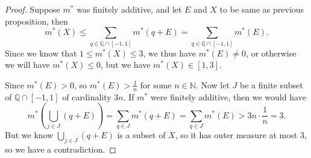 \begin{proof}
    Suppose \(m^*\) was finitely additive, and let \(E\) and \(X\) to be same as previous proposition, then 
    \[
        m^*(X) \le \sum_{q \in \mathbb{Q} \cap [-1, 1]} m^*(q + E) = \sum_{q \in \mathbb{Q} \cap [-1, 1]} m^*(E).   
    \]  
    Since we know that \(1 \le m^*(X) \le 3\), we thus have \(m^*(E) \neq 0\), or otherwise we will have \(m^*(X) \le 0\), but we have \(m^*(X) \in [1, 3]\). 

    Since \(m^*(E) > 0\), so \(m^*(E) > \frac{1}{n}\) for some \(n \in \mathbb{N}\). Now let \(J\) be a finite subset of \(\mathbb{Q} \cap [-1, 1]\) of cardinality \(3n\). If \(m^*\) were finitely additive, then we would have 
    \[
        m^* \left( \bigcup_{j \in J} (q + E)  \right) = \sum_{q \in J} m^*(q + E) = \sum_{q \in J} m^*(E) > 3n \cdot \frac{1}{n} = 3. 
    \] 
    But we know \(\bigcup_{j \in J} (q + E) \) is a subset of \(X\), so it has outer measure at most \(3\), so we have a contradiction.             
\end{proof}
